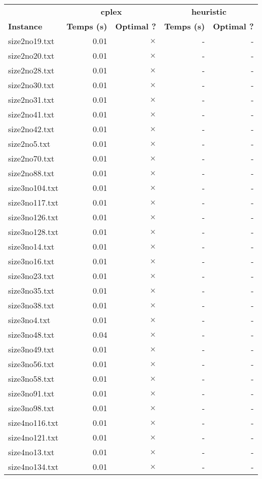 \documentclass{article}
\begin{document}
\newpage
\begin{center}
\renewcommand{\arraystretch}{1.4} 
 \begin{tabular}{lrrrr}
	\hline
 & \multicolumn{2}{c}{\textbf{cplex}} & \multicolumn{2}{c}{\textbf{heuristic}}\\
\textbf{Instance}  & \textbf{Temps (s)} & \textbf{Optimal ?}  & \textbf{Temps (s)} & \textbf{Optimal ?} \\\hline

size2no19.txt & 0.01 & 
$\times$
 & - & - 
\\
size2no20.txt & 0.01 & 
$\times$
 & - & - 
\\
size2no28.txt & 0.01 & 
$\times$
 & - & - 
\\
size2no30.txt & 0.01 & 
$\times$
 & - & - 
\\
size2no31.txt & 0.01 & 
$\times$
 & - & - 
\\
size2no41.txt & 0.01 & 
$\times$
 & - & - 
\\
size2no42.txt & 0.01 & 
$\times$
 & - & - 
\\
size2no5.txt & 0.01 & 
$\times$
 & - & - 
\\
size2no70.txt & 0.01 & 
$\times$
 & - & - 
\\
size2no88.txt & 0.01 & 
$\times$
 & - & - 
\\
size3no104.txt & 0.01 & 
$\times$
 & - & - 
\\
size3no117.txt & 0.01 & 
$\times$
 & - & - 
\\
size3no126.txt & 0.01 & 
$\times$
 & - & - 
\\
size3no128.txt & 0.01 & 
$\times$
 & - & - 
\\
size3no14.txt & 0.01 & 
$\times$
 & - & - 
\\
size3no16.txt & 0.01 & 
$\times$
 & - & - 
\\
size3no23.txt & 0.01 & 
$\times$
 & - & - 
\\
size3no35.txt & 0.01 & 
$\times$
 & - & - 
\\
size3no38.txt & 0.01 & 
$\times$
 & - & - 
\\
size3no4.txt & 0.01 & 
$\times$
 & - & - 
\\
size3no48.txt & 0.04 & 
$\times$
 & - & - 
\\
size3no49.txt & 0.01 & 
$\times$
 & - & - 
\\
size3no56.txt & 0.01 & 
$\times$
 & - & - 
\\
size3no58.txt & 0.01 & 
$\times$
 & - & - 
\\
size3no91.txt & 0.01 & 
$\times$
 & - & - 
\\
size3no98.txt & 0.01 & 
$\times$
 & - & - 
\\
size4no116.txt & 0.01 & 
$\times$
 & - & - 
\\
size4no121.txt & 0.01 & 
$\times$
 & - & - 
\\
size4no13.txt & 0.01 & 
$\times$
 & - & - 
\\
size4no134.txt & 0.01 & 
$\times$
 & - & - 
\\
\hline\end{tabular}
\end{center}
\end{document}
